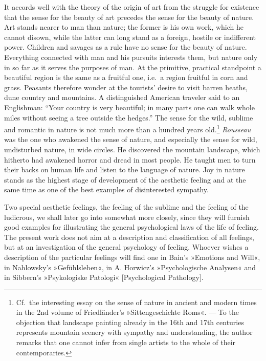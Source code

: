 \documentclass[12pt,a4paper]{book}
\newcommand{\opage}[1]{\marginnote{\footnotesize\textit{[#1]}}}
\begin{document}
It accords well with the theory of the origin of art from the struggle
for existence that the sense for the beauty of art precedes the sense
for the beauty of nature. Art stands nearer to man than nature; the
former is his own work, which he cannot disown, while the latter can
long stand as a foreign, hostile or indifferent power. Children and
savages as a rule have no sense for the beauty of nature. Everything
connected with man and his pursuits interests them, but nature only in
so far as it serves the purposes of man. At the primitive, practical
standpoint a beautiful region is the same as a fruitful one, i.e.\ a
region fruitful in corn and grass. Peasants therefore wonder at the
tourists' desire to visit barren heaths, dune country and mountains. A
distinguished American traveler said to an Englishman: ``Your country is
very beautiful; in many parts one can walk whole miles without seeing a
tree outside the hedges.'' The sense for the wild, sublime and romantic
in nature is not much more than a hundred years
old.\footnote{Cf.\ the interesting essay on the sense of nature in
ancient and modern times in the 2nd volume of Friedländer's
»Sittengeschichte Roms«. --- To the objection that landscape painting
already in the 16th and 17th centuries represents mountain scenery with
sympathy and understanding, the author remarks that one cannot infer
from single artists to the whole of their contemporaries.}
\emph{Rousseau}
\opage{318}was the one who awakened the sense of nature, and especially
the sense for wild, undisturbed nature, in wide circles. He discovered
the mountain landscape, which hitherto had awakened horror and dread in
most people. He taught men to turn their backs on human life and listen
to the language of nature. Joy in nature stands as the highest stage of
development of the aesthetic feeling and at the same time as one of the
best examples of disinterested sympathy.

Two special aesthetic feelings, the feeling of the sublime and the
feeling of the ludicrous, we shall later go into somewhat more closely,
since they will furnish good examples for illustrating the general
psychological laws of the life of feeling. The present work does not aim
at a description and classification of all feelings, but at an
investigation of the general psychology of feeling. Whoever wishes a
description of the particular feelings will find one in Bain's
»Emotions and Will«, in Nahlowsky's »Gefühlsleben«, in A. Horwicz's
»Psychologische Analysen« and in Sibbern's »Psykologiske Patologi«
[Psychological Pathology].
\end{document}
